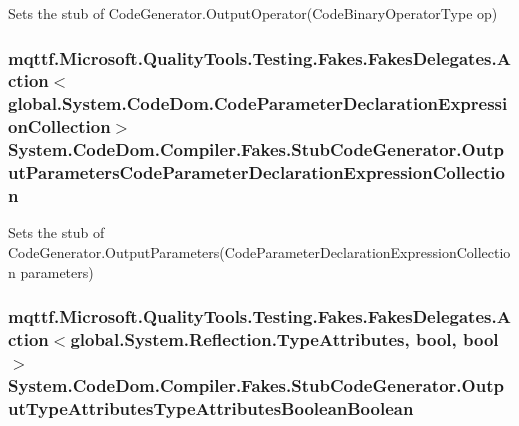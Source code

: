 Sets the stub of Code\-Generator.\-Output\-Operator(\-Code\-Binary\-Operator\-Type op)

\hypertarget{class_system_1_1_code_dom_1_1_compiler_1_1_fakes_1_1_stub_code_generator_a81bf5a6f5dc90adf5489ee82a472e11f}{
\subsubsection[{Output\-Parameters\-Code\-Parameter\-Declaration\-Expression\-Collection}]{\setlength{\rightskip}{0pt plus 5cm}mqttf.\-Microsoft.\-Quality\-Tools.\-Testing.\-Fakes.\-Fakes\-Delegates.\-Action$<$global.\-System.\-Code\-Dom.\-Code\-Parameter\-Declaration\-Expression\-Collection$>$ System.\-Code\-Dom.\-Compiler.\-Fakes.\-Stub\-Code\-Generator.\-Output\-Parameters\-Code\-Parameter\-Declaration\-Expression\-Collection}}\label{class_system_1_1_code_dom_1_1_compiler_1_1_fakes_1_1_stub_code_generator_a81bf5a6f5dc90adf5489ee82a472e11f}


Sets the stub of Code\-Generator.\-Output\-Parameters(\-Code\-Parameter\-Declaration\-Expression\-Collection parameters)

\hypertarget{class_system_1_1_code_dom_1_1_compiler_1_1_fakes_1_1_stub_code_generator_a34822ed95c4cf81aeab7f7c86e59e8fc}{
\subsubsection[{Output\-Type\-Attributes\-Type\-Attributes\-Boolean\-Boolean}]{\setlength{\rightskip}{0pt plus 5cm}mqttf.\-Microsoft.\-Quality\-Tools.\-Testing.\-Fakes.\-Fakes\-Delegates.\-Action$<$global.\-System.\-Reflection.\-Type\-Attributes, bool, bool$>$ System.\-Code\-Dom.\-Compiler.\-Fakes.\-Stub\-Code\-Generator.\-Output\-Type\-Attributes\-Type\-Attributes\-Boolean\-Boolean}}\label{class_system_1_1_code_dom_1_1_compiler_1_1_fakes_1_1_stub_code_generator_a34822ed95c4cf81aeab7f7c86e59e8fc}


